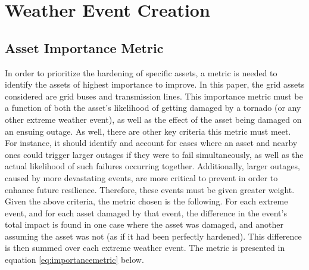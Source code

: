 \documentclass[12pt]{article}
\begin{document}
\section{Weather Event Creation}
\subsection{Asset Importance Metric}
In order to prioritize the hardening of specific assets, a metric is needed to identify the assets of highest importance to improve. In this paper, the grid assets considered are grid buses and transmission lines. This importance metric must be a function of both the asset's likelihood of getting damaged by a tornado (or any other extreme weather event), as well as the effect of the asset being damaged on an ensuing outage. As well, there are other key criteria this metric must meet. For instance, it should identify and account for cases where an asset and nearby ones could trigger larger outages if they were to fail simultaneously, as well as the actual likelihood of such failures occurring together. Additionally, larger outages, caused by more devastating events, are more critical to prevent in order to enhance future resilience. Therefore, these events must be given greater weight.
Given the above criteria, the metric chosen is the following. For each extreme event, and for each asset damaged by that event, the difference in the event’s total impact is found in one case where the asset was damaged, and another assuming the asset was not (as if it had been perfectly hardened). This difference is then summed over each extreme weather event. The metric is presented in equation \eqref{eq:importancemetric} below. 
\end{document}
